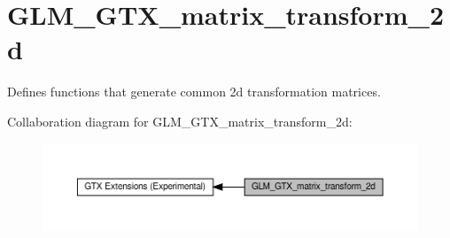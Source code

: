 \hypertarget{group__gtx__matrix__transform__2d}{}\section{G\+L\+M\+\_\+\+G\+T\+X\+\_\+matrix\+\_\+transform\+\_\+2d}
\label{group__gtx__matrix__transform__2d}


Defines functions that generate common 2d transformation matrices.  


Collaboration diagram for G\+L\+M\+\_\+\+G\+T\+X\+\_\+matrix\+\_\+transform\+\_\+2d\+:\nopagebreak
\begin{figure}[H]
\begin{center}
\leavevmode
\includegraphics[width=350pt]{group__gtx__matrix__transform__2d}
\end{center}
\end{figure}
